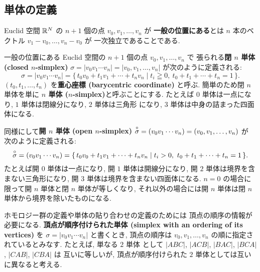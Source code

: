 \documentclass[12pt,twoside]{jarticle}
\begin{document}


\subsection{単体の定義}
\label{sec:simplex}

Euclid 空間 ${\mathbb R}^N$ の $n+1$ 個の点 $v_0,v_1,\ldots,v_n$ が
{\bf 一般の位置にある}とは $n$ 本のベクトル $v_1-v_0,\ldots,v_n-v_0$ が
一次独立であることである. 

一般の位置にある Euclid 空間の $n+1$ 個の点 $v_0,v_1,\ldots,v_n$ で
張られる{\bf 閉 $n$ 単体 (closed $n$-simplex)} %
$\sigma=|v_0v_1\cdots v_n|=|v_0,v_1,\ldots,v_n|$ が次のように定義される:
\begin{equation*}
  \sigma = |v_0v_1\cdots v_n|
  =
  \{\, t_0v_0+t_1v_1+\cdots+t_nv_n 
  \mid t_i\geqq 0,\ t_0+t_1+\cdots+t_n=1 \,\}.
\end{equation*}
$(t_0,t_1,\ldots,t_n)$ を{\bf 重心座標 (barycentric coordinate)} と呼ぶ.
簡単のため閉 $n$ 単体を単に {\bf $n$ 単体 ($n$-simplex)}と呼ぶことにする.
たとえば $0$ 単体は一点になり, $1$ 単体は閉線分になり, $2$ 単体は三角形
になり, $3$ 単体は中身の詰まった四面体になる.

同様にして{\bf 開 $n$ 単体 (open $n$-simplex)} %
${\overset{\circ}{\sigma}} = (v_0v_1\cdots v_n)=(v_0,v_1,\ldots,v_n)$ が
次のように定義される:
\begin{equation*}
  {\overset{\circ}{\sigma}} = (v_0v_1\cdots v_n)
  =
  \{\, t_0v_0+t_1v_1+\cdots+t_nv_n 
  \mid t_i>0,\ t_0+t_1+\cdots+t_n=1 \,\}.
\end{equation*}
たとえば開 $0$ 単体は一点になり, 開 $1$ 単体は開線分になり, %
開 $2$ 単体は境界を含まない三角形になり, %
開 $3$ 単体は境界を含まない四面体になる.
$n=0$ の場合に限って開 $n$ 単体と閉 $n$ 単体が等しくなり, 
それ以外の場合には開 $n$ 単体は閉 $n$ 単体から境界を除いたものになる.

ホモロジー群の定義や単体の貼り合わせの定義のためには
頂点の順序の情報が必要になる. 
{\bf 頂点が順序付けられた単体 (simplex with an ordering of its vertices)}
を $\sigma = |v_0v_1\cdots v_n|$ と書くとき,
頂点の順序は $v_0,v_1,\ldots,v_n$ の順に指定されているとみなす.
たとえば, 単なる $2$ 単体
として $|ABC|$, $|ACB|$, $|BAC|$, $|BCA|$, $|CAB|$, $|CBA|$ は
互いに等しいが, 頂点が順序付けられた $2$ 単体としては互いに異なると考える.
\end{document}
